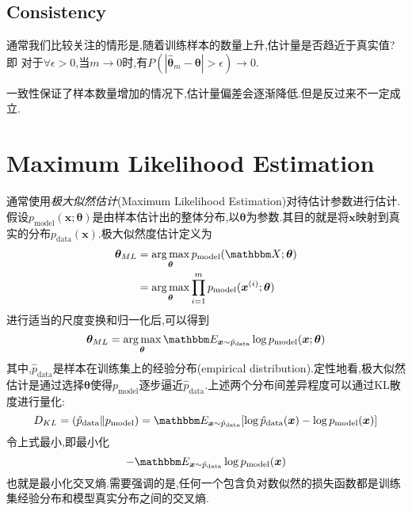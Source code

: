 \subsection{Consistency}\label{subsec:consistency}

通常我们比较关注的情形是,随着训练样本的数量上升,估计量是否趋近于真实值?即
对于$\forall\epsilon>0$,当$m\to0$时,有$P(|\hat{\bm\theta}_m-{\bm\theta}|>\epsilon)\to0$.

一致性保证了样本数量增加的情况下,估计量偏差会逐渐降低.但是反过来不一定成立.

\section{Maximum Likelihood Estimation}

通常使用\textit{极大似然估计}(Maximum Likelihood Estimation)对待估计参数进行估计.假设$p_{\text{model}}(\bm x;{\bm\theta})$是由样本估计出的整体分布,以${\bm\theta}$为参数.其目的就是将$\bm x$映射到真实的分布$p_{\text{data}}(\bm x)$.极大似然度估计定义为
\begin{equation}\begin{split}
{\bm\theta}_{ML}&=\mathop{\arg\max}_{{\bm\theta}}p_{\text{model}}(\mathbbm X;{\bm\theta})\\
&=\mathop{\arg\max}_{{\bm\theta}}\prod_{i=1}^mp_{\text{model}}(\bm x^{(i)};{\bm\theta})
\end{split}\end{equation}
进行适当的尺度变换和归一化后,可以得到
\begin{equation}
{\bm\theta}_{ML}=\mathop{\arg\max}_{{\bm\theta}}\mathbbm E_{\bm x\sim\hat p_{\text{data}}}\log p_{\text{model}}(\bm x;{\bm\theta})
\end{equation}
其中,$\hat p_{\text{data}}$是样本在训练集上的经验分布(empirical distribution).定性地看,极大似然估计是通过选择${\bm\theta}$使得$p_{\text{model}}$逐步逼近$\hat p_{\text{data}}$.上述两个分布间差异程度可以通过KL散度进行量化:
\begin{equation}
D_{KL}=(\hat p_{\text{data}}\|p_{\text{model}})=\mathbbm E_{\bm x\sim\hat p_{\text{data}}}[\log\hat p_{\text{data}}(\bm x)-\log p_{\text{model}}(\bm x)]
\end{equation}
令上式最小,即最小化
\begin{equation}
-\mathbbm E_{\bm x\sim\hat p_{\text{data}}}\log p_{\text{model}}(\bm x)
\end{equation}
也就是最小化交叉熵.需要强调的是,任何一个包含负对数似然的损失函数都是训练集经验分布和模型真实分布之间的交叉熵.

